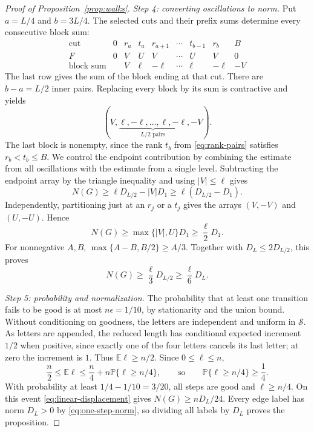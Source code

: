 \documentclass[11pt]{article}
\theoremstyle{definition}
\theoremstyle{remark}
\newcommand{\E}{\mathbb E}
\newcommand{\Prob}{\mathbb P}
\newcommand{\cS}{\mathcal S}
\begin{document}
\begin{proof}[Proof of Proposition~\ref{prop:walks}]
\par\smallskip
{}
\noindent\emph{Step 4: converting oscillations to norm.}
Put $a=L/4$ and $b=3L/4$.
The selected cuts and their prefix sums determine every consecutive
block sum:
\[
\begin{array}{c|cccccccc}
 \text{cut}&0&r_a&t_a&r_{a+1}&\cdots&t_{b-1}&r_b&B\\
 F&0&V&U&V&\cdots&U&V&0\\
 \text{block sum}& &V&\ell&-\ell&\cdots&\ell&-\ell&-V
\end{array}
\]
The last row gives the sum of the block ending at that cut.
There are $b-a=L/2$ inner pairs. Replacing every block by its sum is
contractive and yields
\begin{equation}\label{eq:compressed}
 (V,\underbrace{\ell,-\ell,\ldots,\ell,-\ell}_{L/2\text{ pairs}},-V).
\end{equation}
The last block is nonempty, since the rank $t_b$ from
\eqref{eq:rank-pairs} satisfies $r_b<t_b\leq B$.
We control the endpoint contribution by combining the estimate from all
oscillations with the estimate from a single level.
Subtracting the endpoint array by the triangle inequality and using
$|V|\leq\ell$ gives
\[
 N(G)\geq\ell D_{L/2}-|V|D_1
       \geq\ell(D_{L/2}-D_1).
\]
Independently, partitioning just at an $r_j$ or a $t_j$ gives the arrays
$(V,-V)$ and $(U,-U)$. Hence
\[
 N(G)\geq\max\{|V|,U\}D_1\geq\frac\ell2D_1.
\]
For nonnegative $A,B$, $\max\{A-B,B/2\}\geq A/3$.
Together with $D_L\leq2D_{L/2}$, this proves
\begin{equation}\label{eq:linear-displacement}
 N(G)\geq\frac\ell3D_{L/2}\geq\frac\ell6D_L.
\end{equation}

\par\smallskip
{}
\noindent\emph{Step 5: probability and normalization.}
The probability that at least one transition fails to be good is at most
$n\epsilon=1/10$, by stationarity and the union bound.
Without conditioning on goodness, the letters are independent and
uniform in $\cS$.
As letters are appended, the reduced length has conditional expected
increment $1/2$ when positive, since exactly one of the four letters
cancels its last letter; at zero the increment is $1$.
Thus $\E\ell\geq n/2$. Since $0\leq\ell\leq n$,
\[
 \frac n2\leq\E\ell
 \leq\frac n4+n\Prob\{\ell\geq n/4\},
 \qquad\text{so}\qquad
 \Prob\{\ell\geq n/4\}\geq\frac14.
\]
With probability at least $1/4-1/10=3/20$, all steps are good and
$\ell\geq n/4$. On this event \eqref{eq:linear-displacement} gives
$N(G)\geq nD_L/24$. Every edge label has norm $D_L>0$ by
\eqref{eq:one-step-norm}, so dividing all labels by $D_L$ proves the
proposition.
\end{proof}
\end{document}
